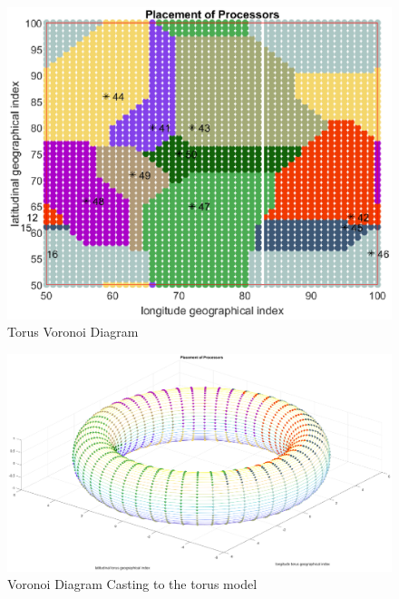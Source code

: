 \begin{figure}[!ht]
\centering
\includegraphics[width=1\columnwidth]{figure/t_voronoi.eps}
\caption{Torus Voronoi Diagram}
\label{fig:t_voronoi}
\end{figure}

\begin{figure}[!ht]
\centering
\includegraphics[width=1\columnwidth]{figure/t_voronoi_torus.eps}
\caption{Voronoi Diagram Casting to the torus model}
\label{fig:t_voronoi_torus}
\end{figure}

